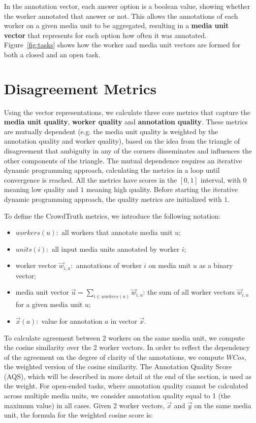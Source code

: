 In the annotation vector, each answer option is a boolean value, showing whether the worker annotated that answer or not. This allows the annotations of each worker on a given media unit to be aggregated, resulting in a \textbf{media unit vector} that represents for each option how often it was annotated. Figure~\ref{fig:tasks} shows how the worker and media unit vectors are formed for both a closed and an open task.

\section{Disagreement Metrics}
\label{app:metrics}

Using the vector representations, we calculate three core metrics that capture the \textbf{media unit quality}, \textbf{worker quality} and \textbf{annotation quality}. These metrics are mutually dependent (e.g. the media unit quality is weighted by the annotation quality and worker quality), based on the idea from the triangle of disagreement that ambiguity in any of the corners disseminates and influences the other components of the triangle. The mutual dependence requires an iterative dynamic programming approach, calculating the metrics in a loop until convergence is reached. All the metrics have scores in the $[0,1]$ interval, with $0$ meaning low quality and $1$ meaning high quality. Before starting the iterative dynamic programming approach, the quality metrics are initialized with $1$. %

To define the CrowdTruth metrics, we introduce the following notation:
\begin{itemize}
\item $workers(u):$ all workers that annotate media unit $u$;
\item $units(i):$ all input media units annotated by worker $i$;
\item worker vector $\vec{w}_{i, u}:$ annotations of worker $i$ on media unit $u$ as a binary vector;
\item media unit vector $\vec{u} = \sum\limits_{i \in workers(u)} \vec{w}_{i,u}$: the sum of all worker vectors $\vec{w}_{i,u}$ for a given media unit $u$;
\item $\vec{x}(a):$ value for annotation $a$ in vector $\vec{x}$.
\end{itemize}

To calculate agreement between 2 workers on the same media unit, we compute the cosine similarity over the 2 worker vectors. In order to reflect the dependency of the agreement on the degree of clarity of the annotations, we compute $WCos$, the weighted version of the cosine similarity. The Annotation Quality Score (AQS), which will be described in more detail at the end of the section, is used as the weight. For open-ended tasks, where annotation quality cannot be calculated across multiple media units, we consider annotation quality equal to 1 (the maximum value) in all cases. Given 2 worker vectors, $\vec{x}$ and $\vec{y}$ on the same media unit, the formula for the weighted cosine score is:

